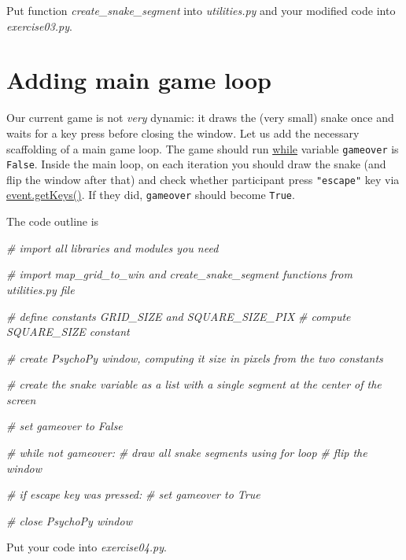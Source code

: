 \documentclass[
]{book}
\newenvironment{Shaded}{\begin{snugshade}}{\end{snugshade}}
\newcommand{\CommentTok}[1]{\textcolor[rgb]{0.56,0.35,0.01}{\textit{#1}}}
\begin{document}
Put function \emph{create\_snake\_segment} into \emph{utilities.py} and your modified code into \emph{exercise03.py}.

\hypertarget{adding-main-game-loop}{%
\section{Adding main game loop}\label{adding-main-game-loop}}

Our current game is not \emph{very} dynamic: it draws the (very small) snake once and waits for a key press before closing the window. Let us add the necessary scaffolding of a main game loop. The game should run \href{https://docs.python.org/3/reference/compound_stmts.html\#the-while-statement}{while} variable \texttt{gameover} is \texttt{False}. Inside the main loop, on each iteration you should draw the snake (and flip the window after that) and check whether participant press \texttt{"escape"} key via \href{https://www.psychopy.org/api/event.html\#psychopy.event.getKeys}{event.getKeys()}. If they did, \texttt{gameover} should become \texttt{True}.

The code outline is

\begin{Shaded}
\begin{Highlighting}[]
\CommentTok{\# import all libraries and modules you need}

\CommentTok{\# import map\_grid\_to\_win and create\_snake\_segment functions from utilities.py file}

\CommentTok{\# define constants GRID\_SIZE and SQUARE\_SIZE\_PIX}
\CommentTok{\# compute SQUARE\_SIZE constant}

\CommentTok{\# create PsychoPy window, computing it size in pixels from the two constants}

\CommentTok{\# create the snake variable as a list with a single segment at the center of the screen }

\CommentTok{\# set gameover to False}

\CommentTok{\# while not gameover:}
\CommentTok{\#     draw all snake segments using for loop  }
\CommentTok{\#     flip the window}

\CommentTok{\#     if escape key was pressed:}
\CommentTok{\#         set gameover to True}

\CommentTok{\# close PsychoPy window}
\end{Highlighting}
\end{Shaded}

Put your code into \emph{exercise04.py}.
\end{document}
